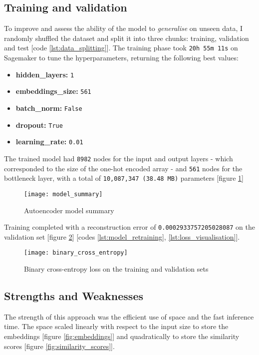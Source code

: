 \subsection{Training and validation}

To improve and assess the ability of the model to \textit{generalise} on unseen data, I randomly shuffled the dataset and split
it into three chunks: training, validation and test [code \ref{lst:data_splitting}].
The training phase took \verb|20h 55m 11s| on Sagemaker to tune the hyperparameters,
returning the following best values:

\begin{itemize}
  \item \textbf{hidden\_layers:} \verb|1|
  \item \textbf{embeddings\_size:} \verb|561|
  \item \textbf{batch\_norm:} \verb|False|
  \item \textbf{dropout:} \verb|True|
  \item \textbf{learning\_rate:} \verb|0.01|
\end{itemize}

The trained model had \verb|8982| nodes for the input and output layers - which corresponded to the size of
the one-hot encoded array - and \verb|561| nodes for the bottleneck layer, with a total of \verb|10,087,347 (38.48 MB)|
parameters [figure \ref{fig:model_summary}]

\begin{figure}[H]
  \centering
  \texttt{[image: model\_summary]}
  \caption{Autoencoder model summary}
  \label{fig:model_summary}
\end{figure}

Training completed with a reconstruction error of \verb|0.0002933757205028087| on the validation set
[figure \ref{fig:binary_cross_entropy}] [codes \ref{lst:model_retraining}, \ref{lst:loss_visualisation}].

\begin{figure}[H]
  \centering
  \texttt{[image: binary\_cross\_entropy]}
  \caption{Binary cross-entropy loss on the training and validation sets}
  \label{fig:binary_cross_entropy}
\end{figure}

\subsection{Strengths and Weaknesses}

The strength of this approach was the efficient use of space and the fast inference time.
The space scaled linearly with respect to the input size to store the embeddings [figure \ref{fig:embeddings}]
and quadratically to store the similarity scores [figure \ref{fig:similarity_scores}].

